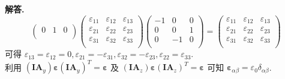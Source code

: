 \documentclass[11pt]{ctexart}
\newenvironment{solution}{\par\noindent\textbf{解答. }}{\par}
\begin{document}
\begin{solution}
$$\begin{pmatrix}
        0 & 1 & 0 \\
    \end{pmatrix}
    \begin{pmatrix}
        \varepsilon_{11} & \varepsilon_{12} & \varepsilon_{13} \\
        \varepsilon_{21} & \varepsilon_{22} & \varepsilon_{23} \\
        \varepsilon_{31} & \varepsilon_{32} & \varepsilon_{33} \\
    \end{pmatrix}
    \begin{pmatrix}
        -1 & 0 & 0 \\
        0 & 0 & 1 \\
        0 & -1 & 0 \\
    \end{pmatrix} = 
    \begin{pmatrix}
        \varepsilon_{11} & \varepsilon_{12} & \varepsilon_{13} \\
        \varepsilon_{21} & \varepsilon_{22} & \varepsilon_{23} \\
        \varepsilon_{31} & \varepsilon_{32} & \varepsilon_{33} \\
    \end{pmatrix}
    $$
    可得 $\varepsilon_{13} = \varepsilon_{12} = 0,\varepsilon_{21} = -\varepsilon_{31},\varepsilon_{32} = -\varepsilon_{23},\varepsilon_{22} = \varepsilon_{33}$. \\
    利用 $\left(\mathbf{I}\mathbf{A}_y\right)\bm{\varepsilon}\left(\mathbf{I}\mathbf{A}_y\right)^T = \bm{\varepsilon}$ 及  $\left(\mathbf{I}\mathbf{A}_z\right)\bm{\varepsilon}\left(\mathbf{I}\mathbf{A}_z\right)^T = \bm{\varepsilon}$ 可知 
    $\bm{\varepsilon}_{\alpha\beta} = \varepsilon_0\delta_{\alpha\beta}$.
\end{solution}
\end{document}
